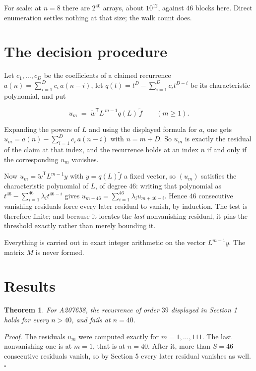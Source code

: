\documentclass[11pt]{article}
\newtheorem{theorem}{Theorem}
\theoremstyle{definition}
\begin{document}
For scale: at $n = 8$ there are $2^{40}$ arrays, about $10^{12}$, against $46$ blocks here. Direct enumeration settles nothing at that size; the walk count does.

\section{The decision procedure}

Let $c_1,\dots,c_D$ be the coefficients of a claimed recurrence $a(n) = \sum_{i=1}^{D} c_i\,a(n-i)$, let $q(t) = t^{D} - \sum_{i=1}^{D} c_i t^{D-i}$ be its characteristic polynomial, and put

\[u_m \;=\; \tilde w^{\mathsf T} L^{\,m-1} q(L)\,\tilde f \qquad (m \ge 1).\]

Expanding the powers of $L$ and using the displayed formula for $a$, one gets $u_m = a(n) - \sum_{i=1}^{D} c_i\,a(n-i)$ with $n = m + D$. So $u_m$ is exactly the residual of the claim at that index, and the recurrence holds at an index $n$ if and only if the corresponding $u_m$ vanishes.

Now $u_m = \tilde w^{\mathsf T} L^{m-1} y$ with $y = q(L)\tilde f$ a fixed vector, so $(u_m)$ satisfies the characteristic polynomial of $L$, of degree $46$: writing that polynomial as $t^{46} - \sum_{i=1}^{46} \lambda_i t^{46-i}$ gives $u_{m+46} = \sum_{i=1}^{46} \lambda_i u_{m+46-i}$. Hence $46$ consecutive vanishing residuals force every later residual to vanish, by induction. The test is therefore finite; and because it locates the {\itshape last} nonvanishing residual, it pins the threshold exactly rather than merely bounding it.

Everything is carried out in exact integer arithmetic on the vector $L^{m-1}y$. The matrix $M$ is never formed.

\section{Results}

\begin{theorem} For A207658, the recurrence of order $39$ displayed in Section 1 holds for every $n > 40$, and fails at $n = 40$.\end{theorem}

{\itshape Proof.} The residuals $u_m$ were computed exactly for $m = 1,\dots,111$. The last nonvanishing one is at $m = 1$, that is at $n = 40$. After it, more than $S = 46$ consecutive residuals vanish, so by Section 5 every later residual vanishes as well. $\square$
\end{document}
